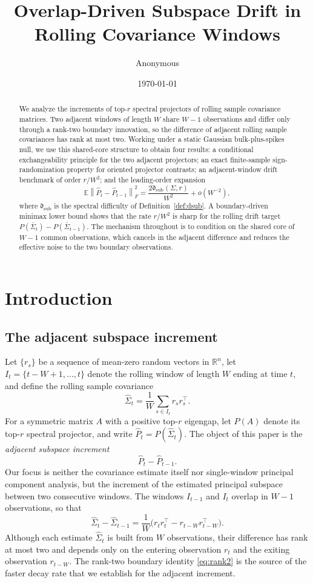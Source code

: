 \documentclass[11pt]{article}
\title{Overlap-Driven Subspace Drift in Rolling Covariance Windows}
\author{Anonymous}
\date{\today}
\theoremstyle{tightplain}
\theoremstyle{tightdef}
\newcommand{\E}{\mathbb E}
\newcommand{\R}{\mathbb R}
\newcommand{\norm}[1]{\left\lVert #1 \right\rVert}
\begin{document}
\maketitle

\begin{abstract}
We analyze the increments of top-$r$ spectral projectors of rolling sample
covariance matrices. Two adjacent windows of length $W$ share $W-1$
observations and differ only through a rank-two boundary innovation, so the
difference of adjacent rolling sample covariances has rank at most two.
Working under a static Gaussian bulk-plus-spikes null, we use this shared-core
structure to obtain four results: a conditional exchangeability principle for
the two adjacent projectors; an exact finite-sample sign-randomization
property for oriented projector contrasts; an adjacent-window drift benchmark
of order $r/W^2$; and the leading-order expansion
\[
\E\norm{\widehat P_t-\widehat P_{t-1}}_F^2
=
\frac{2\mathfrak d_{\mathrm{sub}}(\Sigma,r)}{W^2}+o(W^{-2}),
\]
where $\mathfrak d_{\mathrm{sub}}$ is the spectral difficulty of
Definition~\ref{def:dsub}. A boundary-driven minimax lower bound shows that the
rate $r/W^2$ is sharp for the rolling drift target
$P(\bar\Sigma_t)-P(\bar\Sigma_{t-1})$. The mechanism throughout is to condition
on the shared core of $W-1$ common observations, which cancels in the adjacent
difference and reduces the effective noise to the two boundary observations.
\end{abstract}

\section{Introduction}

\subsection{The adjacent subspace increment}

Let $\{r_s\}$ be a sequence of mean-zero random vectors in $\R^n$, let
$I_t=\{t-W+1,\ldots,t\}$ denote the rolling window of length $W$ ending at time
$t$, and define the rolling sample covariance
\[
\widehat\Sigma_t=\frac1W\sum_{s\in I_t}r_s r_s^\top.
\]
For a symmetric matrix $A$ with a positive top-$r$ eigengap, let $P(A)$ denote
its top-$r$ spectral projector, and write $\widehat P_t=P(\widehat\Sigma_t)$.
The object of this paper is the \emph{adjacent subspace increment}
\[
\widehat P_t-\widehat P_{t-1}.
\]
Our focus is neither the covariance estimate itself nor single-window principal
component analysis, but the increment of the estimated principal subspace
between two consecutive windows. The windows $I_{t-1}$ and $I_t$ overlap in
$W-1$ observations, so that
\begin{equation}\label{eq:rank2}
\widehat\Sigma_t-\widehat\Sigma_{t-1}
=\frac1W\bigl(r_t r_t^\top-r_{t-W}r_{t-W}^\top\bigr).
\end{equation}
Although each estimate $\widehat\Sigma_t$ is built from $W$ observations, their
difference has rank at most two and depends only on the entering observation
$r_t$ and the exiting observation $r_{t-W}$. The rank-two boundary identity
\eqref{eq:rank2} is the source of the faster decay rate that we establish for
the adjacent increment.
\end{document}
